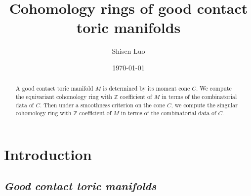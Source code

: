 \documentclass[12pt]{amsart}
\theoremstyle{definition}
\numberwithin{equation}{section}
\begin{document}
\title{Cohomology rings of good contact toric manifolds}

\author{Shisen Luo}

\address{Department of Mathematics, Cornell University,
Ithaca, NY 14853-4201, USA}



\begin{abstract}
A good contact toric manifold $M$ is determined by its moment cone
$C$. We compute the equivariant cohomology ring with ${{\mathbb{Z}}}$
coefficient of $M$ in terms of the combinatorial data of $C$. Then
under a smoothness criterion on the cone $C$, we compute the
singular cohomology ring with ${{\mathbb{Z}}}$ coefficient of $M$ in terms of
the combinatorial data of $C$.
\end{abstract}

\date{\today}

\maketitle \tableofcontents
\section{\bf Introduction}\label{sec:introduction}

\subsection{\it Good contact toric manifolds}
\end{document}
